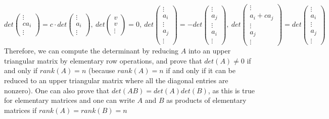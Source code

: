 \documentclass[11pt,a4paper]{report}
\begin{document}
\[
det\begin{pmatrix}\vdots \\ ca_i \\ \vdots\end{pmatrix}
= c\cdot det\begin{pmatrix}\vdots \\ a_i \\ \vdots\end{pmatrix}, \ 
det\begin{pmatrix}v \\ v \\ \vdots\end{pmatrix} = 0, \ 
det\begin{pmatrix}\vdots \\ a_i \\ \vdots \\ a_j \\ \vdots \end{pmatrix} = 
-det\begin{pmatrix}\vdots \\ a_j \\ \vdots \\ a_i \\ \vdots \end{pmatrix}, \ 
det\begin{pmatrix}\vdots \\ a_i + ca_j \\ \vdots \\ a_j \\ \vdots \end{pmatrix} = det\begin{pmatrix}\vdots \\ a_i \\ \vdots \\ a_j \\ \vdots \end{pmatrix}
\]
Therefore, we can compute the determinant by reducing $A$ into an upper triangular matrix by elementary row operations, and prove that $det(A)\ne 0$ if and only if $rank(A)=n$ (because $rank(A)=n$ if and only if it can be reduced to an upper triangular matrix where all the diagonal entries are nonzero).
\newline\newline One can also prove that $det(AB)=det(A)det(B)$, as this is true for elementary matrices and one can write $A$ and $B$ as products of elementary matrices if $rank(A)=rank(B)=n$
\end{document}

